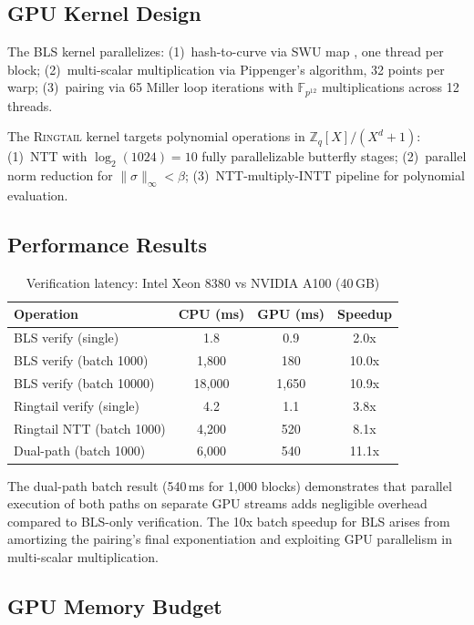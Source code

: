 \documentclass[11pt,letterpaper]{article}
\theoremstyle{definition}
\theoremstyle{remark}
\newcommand{\Ringtail}{\textsc{Ringtail}}
\begin{document}
\subsection{GPU Kernel Design}

The BLS kernel parallelizes: (1)~hash-to-curve via SWU map \cite{wahby2019fast}, one thread per block; (2)~multi-scalar multiplication via Pippenger's algorithm, 32 points per warp; (3)~pairing via 65 Miller loop iterations with $\mathbb{F}_{p^{12}}$ multiplications across 12 threads.

The \Ringtail{} kernel targets polynomial operations in $\mathbb{Z}_q[X]/(X^d + 1)$: (1)~NTT with $\log_2(1024) = 10$ fully parallelizable butterfly stages; (2)~parallel norm reduction for $\|\sigma\|_\infty < \beta$; (3)~NTT-multiply-INTT pipeline for polynomial evaluation.

\subsection{Performance Results}

\begin{table}[h]
\centering
\begin{tabular}{lccc}
\toprule
\textbf{Operation} & \textbf{CPU (ms)} & \textbf{GPU (ms)} & \textbf{Speedup} \\
\midrule
BLS verify (single) & 1.8 & 0.9 & 2.0x \\
BLS verify (batch 1000) & 1,800 & 180 & 10.0x \\
BLS verify (batch 10000) & 18,000 & 1,650 & 10.9x \\
Ringtail verify (single) & 4.2 & 1.1 & 3.8x \\
Ringtail NTT (batch 1000) & 4,200 & 520 & 8.1x \\
Dual-path (batch 1000) & 6,000 & 540 & 11.1x \\
\bottomrule
\end{tabular}
\caption{Verification latency: Intel Xeon 8380 vs NVIDIA A100 (40\,GB)}
\label{tab:gpu-perf}
\end{table}

The dual-path batch result (540\,ms for 1,000 blocks) demonstrates that parallel execution of both paths on separate GPU streams adds negligible overhead compared to BLS-only verification. The 10x batch speedup for BLS arises from amortizing the pairing's final exponentiation and exploiting GPU parallelism in multi-scalar multiplication.

\subsection{GPU Memory Budget}
\end{document}
